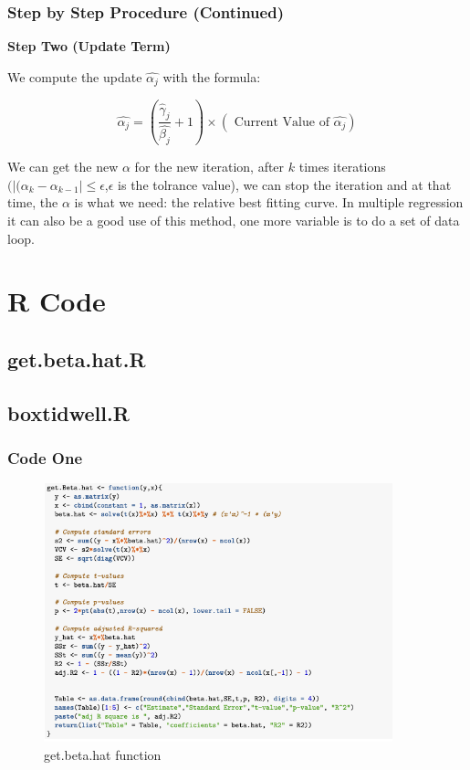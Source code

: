 \documentclass[10pt,aspectratio=32]{beamer}
\begin{document}
\begin{frame}
 	\frametitle{Step by Step Procedure (Continued)}
 \textbf{Step Two (Update Term)}

 We compute the update $\hat{\alpha_j}$ with the formula:

 $$
 	\hat{\alpha_j} = (\frac{\hat{\gamma}_j}{\hat{\beta_j}} + 1) \times (\text{ Current Value of } \hat{\alpha_j})
 $$

We can get the new $\alpha$ for the new iteration, after $k$ times iterations $(|(\alpha_{k} - \alpha_{k-1}| \leq \epsilon$,$\epsilon$ is the tolrance value), we can stop the iteration and at that time, the $\alpha$ is what we need: the relative best fitting curve. In multiple regression it can also be a good use of this method, one more variable is to do a set of data loop.
\end{frame}



\section{R Code}
\subsection{get.beta.hat.R}
\subsection{boxtidwell.R}

\begin{frame}
 \frametitle{Code One}
 \vspace{-0.3cm}
	\begin{figure}[get.beta.hat]
		\centering
		\includegraphics[width=0.9\textwidth]{get.png}
		\caption{get.beta.hat function}
	\end{figure}
\end{frame}
\end{document}
